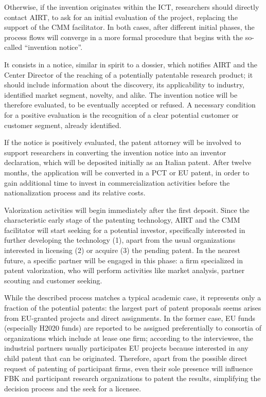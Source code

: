 Otherwise, if the invention originates within the ICT, researchers should directly contact AIRT, to ask for an initial evaluation of the project, replacing the support of the CMM facilitator. In both cases, after different initial phases, the process flows will converge in a more formal procedure that begins with the so-called \enquote{invention notice}. 

It consists in a notice, similar in spirit to a dossier, which notifies AIRT and the Center Director of the reaching of a potentially patentable research product; it should include information about the discovery, its applicability to industry, identified market segment, novelty, and alike. The invention notice will be therefore evaluated, to be eventually accepted or refused. A necessary condition for a positive evaluation is the recognition of a clear potential customer or customer segment, already identified.

If the notice is positively evaluated, the patent attorney will be involved to support researchers in converting the invention notice into an inventor declaration, which will be deposited initially as an Italian patent. After twelve months, the application will be converted in a PCT or EU patent, in order to gain additional time to invest in commercialization activities before the nationalization process and its relative costs.

Valorization activities will begin immediately after the first deposit. Since the characteristic early stage of the patenting technology, AIRT and the CMM facilitator will start seeking for a potential investor, specifically interested in further developing the technology (1), apart from the usual organizations interested in licensing (2) or acquire (3) the pending patent. In the nearest future, a specific partner will be engaged in this phase: a firm specialized in patent valorization, who will perform activities like market analysis, partner scouting and customer seeking. 

While the described process matches a typical academic case, it represents only a fraction of the potential patents: the largest part of patent proposals seems arises from EU-granted projects and direct assignments. In the former case, EU funds (especially H2020 funds) are reported to be assigned preferentially to consortia of organizations which include at lease one firm; according to the interviewee, the industrial partners usually participates EU projects because interested in any child patent that can be originated. Therefore, apart from the possible direct request of patenting of participant firms, even their sole presence will influence FBK and participant research organizations to patent the results, simplifying the decision process and the seek for a licensee. 

